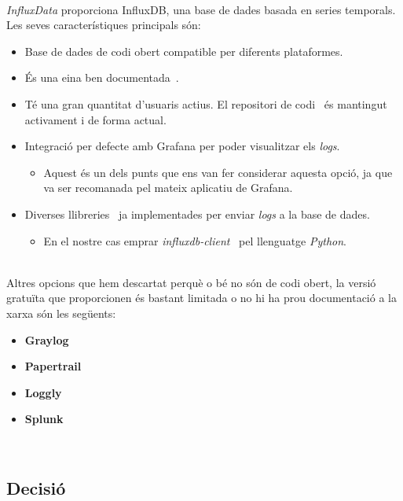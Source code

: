 \noindent \\
\textit{InfluxData} proporciona InfluxDB, una base de dades basada en series temporals.
Les seves característiques principals són:

\begin{itemize}
    \item Base de dades de codi obert compatible per diferents plataformes.
    \item És una eina ben documentada~\cite{influxdb:documentation}.
    \item Té una gran quantitat d’usuaris actius.
    El repositori de codi~\cite{influxdb:code} és mantingut activament i de forma actual.
    \item Integració per defecte amb Grafana per poder visualitzar els \textit{logs}.
    \begin{itemize}
        \item Aquest és un dels punts que ens van fer considerar aquesta opció, ja que va ser recomanada pel mateix aplicatiu de Grafana.
    \end{itemize}
    \item Diverses llibreries~\cite{influxdb:libraries} ja implementades per enviar \textit{\gls{log}s} a la base de dades.
    \begin{itemize}
        \item En el nostre cas emprar \textit{influxdb-client}~\cite{influxdb:python} pel llenguatge \textit{Python}.
    \end{itemize}
\end{itemize}

\noindent \\
Altres opcions que hem descartat perquè o bé no són de codi obert, la versió gratuïta que proporcionen és bastant limitada o no hi ha prou documentació a la xarxa són les següents:

\begin{itemize}
    \item \textbf{Graylog}~\cite{graylog}
    \item \textbf{Papertrail}~\cite{papertrail}
    \item \textbf{Loggly}~\cite{loggly}
    \item \textbf{Splunk}~\cite{splunk}
\end{itemize}

\clearpage

\noindent \\
\subsection{Decisió}\label{subsec:log-db-decision}

